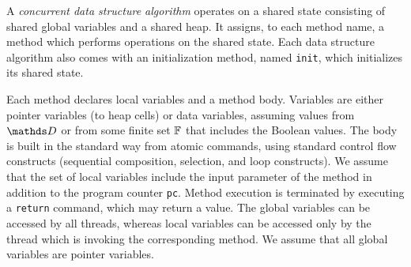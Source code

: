A {\em concurrent data structure algorithm} operates on a shared
state consisting of shared global variables and a shared heap.
It assigns, to each method name, a method which performs operations
%
on the shared state.
Each data structure algorithm also comes with an initialization method,
named {\tt init}, which initializes its shared state.

%
Each method declares local variables
  and a method body.
%
Variables are either pointer variables
(to heap cells)
or data variables, assuming values from $\ddomain$
or from some finite set $\mathbb{F}$ that includes the Boolean values.
%
%
The body is built in the standard way
from atomic commands, using standard control
flow constructs (sequential composition, selection, and loop constructs).
%
%
We assume that the set of local variables include the input
parameter of the method
in addition to the program counter {\tt pc}.
%
Method execution is terminated by executing a {\tt return} command,
which may return a value.
The global variables can be
accessed by all threads, whereas local variables can be accessed only
by the thread which is invoking the corresponding method.
%
We assume that all global variables are pointer variables.

